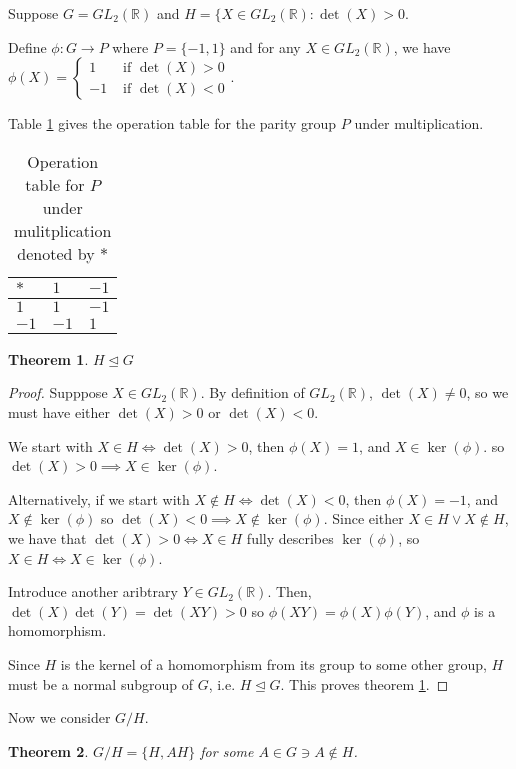 \documentclass[12pt]{article}
\newcommand{\reals}{\mathbb{R}}
\newcommand{\gltwo}{GL_2(\reals)}
\newtheorem{thm}{Theorem}
\begin{document}
Suppose $G = \gltwo$ and $H = \{X \in \gltwo: \det(X) > 0$.

Define $\phi:G \to P$ where $P = \{-1,1\}$ and for any $X \in \gltwo$,
we have $\phi(X) = \begin{cases} 1 & \textrm{ if } \det(X) > 0 \\
				-1 & \textrm{ if } \det(X) < 0 \end{cases}$.

Table \ref{t5} gives the operation table
for the parity group $P$
under multiplication.

\begin{table}[!ht]
	\begin{tabular}{l|ll}
		$*$ & $1$ & $-1$ \\ \hline
		$1$ & $1$ & $-1$ \\
		$-1$ & $-1$ & $1$
	\end{tabular}
	\centering
	\caption{Operation table for $P$ under mulitplication denoted by $*$}
	\label{t5}
\end{table}

\begin{thm} \label{thm11}
	$H \trianglelefteq G$
\end{thm}

\begin{proof}
	Supppose $X \in \gltwo$.
	By definition of $\gltwo$,
	$\det(X) \neq 0$,
	so we must have either
	$\det(X) > 0$
	or $\det(X) < 0$.

	We start with $X \in H \iff \det(X) > 0$,
	then $\phi(X) = 1$,
	and $X \in \ker(\phi)$.
	so $\det(X) > 0 \implies X \in \ker(\phi)$.

	Alternatively,
	if we start with $X \not\in H \iff \det(X) < 0$, 
	then $\phi(X) = -1$,
	and $X \not\in \ker(\phi)$
	so $\det(X) < 0 \implies X \not\in \ker(\phi)$.
	Since either $X \in H \lor X \not\in H$,
	we have that $\det(X) > 0 \iff X \in H$
	fully describes $\ker(\phi)$,
	so $X \in H \iff X \in \ker(\phi)$.

	Introduce another aribtrary $Y \in \gltwo$.
	Then, $\det(X)\det(Y) = \det(XY) > 0$
	so $\phi(XY) = \phi(X)\phi(Y)$,
	and $\phi$ is a homomorphism.


	Since $H$ is the kernel of a homomorphism
	from its group to some other group,
	$H$ must be a normal subgroup of $G$,
	i.e. $H \trianglelefteq G$.
	This proves theorem \ref{thm11}.
\end{proof}

Now we consider $G/H$.


\begin{thm} \label{thm12}
	$G/H = \{H, AH\}$ for some $A \in G \ni A \not\in H$.
\end{thm}
\end{document}

